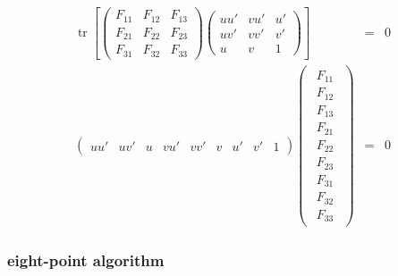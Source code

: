 \documentclass{beamer}
\newcommand{\nospace}{}
\newcommand{\tmop}[1]{\ensuremath{\operatorname{#1}}}
\begin{document}
{{\begin{frame}
  \begin{eqnarray*}
    \tmop{tr} \left[ \left(\begin{array}{ccc}
      F_{11} & F_{12} & F_{13}\\
      F_{21} & F_{22} & F_{23}\\
      F_{31} & F_{32} & F_{33}
    \end{array}\right) \left(\begin{array}{ccc}
      u \nospace \nospace u' & v \nospace \nospace u' & \nospace u'\\
      u \nospace v' & v \nospace v' & v'\\
      u & v & 1
    \end{array}\right) \right] & = & 0\\
    \left(\begin{array}{ccccccccc}
      uu' & uv' & u & vu' & vv' & v & u' & v' & 1
    \end{array}\right) \left(\begin{array}{c}
      \begin{array}{c}
        F_{11}\\
        F_{12}\\
        F_{13}\\
        F_{21}\\
        F_{22}\\
        F_{23}\\
        F_{31}\\
        F_{32}\\
        F_{33}
      \end{array}
    \end{array}\right) & = & 0
  \end{eqnarray*}
  
\end{frame}}{\begin{frame}
  \frametitle{eight-point algorithm}
  
  \
  

\end{frame}}}
\end{document}
